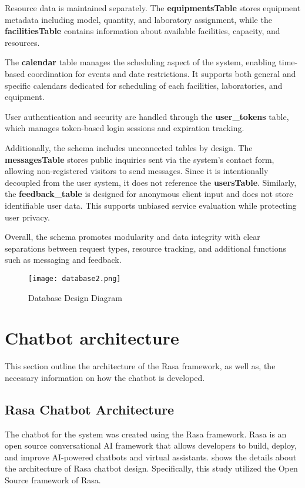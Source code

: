 Resource data is maintained separately. The \textbf{equipmentsTable} stores equipment metadata including model, quantity, and laboratory assignment, while the \textbf{facilitiesTable} contains information about available facilities, capacity, and resources. 

The \textbf{calendar} table manages the scheduling aspect of the system, enabling time-based coordination for events and date restrictions. It supports both general and specific calendars dedicated for scheduling of each facilities, laboratories, and equipment.

User authentication and security are handled through the \textbf{user\_tokens} table, which manages token-based login sessions and expiration tracking.

Additionally, the schema includes unconnected tables by design. The \textbf{messagesTable} stores public inquiries sent via the system's contact form, allowing non-registered visitors to send messages. Since it is intentionally decoupled from the user system, it does not reference the \textbf{usersTable}. Similarly, the \textbf{feedback\_table} is designed for anonymous client input and does not store identifiable user data. This supports unbiased service evaluation while protecting user privacy.

Overall, the schema promotes modularity and data integrity with clear separations between request types, resource tracking, and additional functions such as messaging and feedback.

\newpage

\begin{figure}[h]
	\centering 
	\texttt{[image: database2.png]}
	\caption{Database Design Diagram}
	\label{fig:database}
\end{figure}

\section{Chatbot architecture}

This section outline the architecture of the Rasa framework, as well as, the necessary information on how the chatbot is developed.

\subsection{Rasa Chatbot Architecture}

The chatbot for the system was created using the Rasa framework. Rasa is an open source conversational AI framework that allows developers to build, deploy, and improve AI-powered chatbots and virtual assistants.  shows the details about the architecture of Rasa chatbot design. Specifically, this study utilized the Open Source framework of Rasa.

